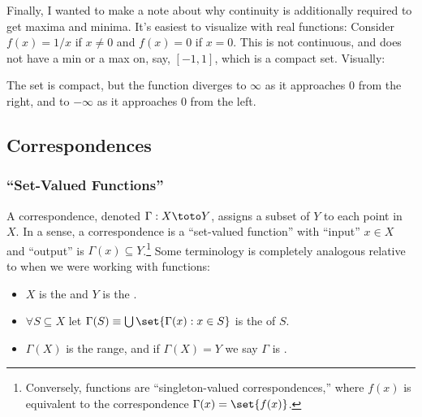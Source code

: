\documentclass{article}
\begin{document}
Finally, I wanted to make a note about why continuity is additionally required to get maxima and minima. It's easiest to visualize with real functions: Consider $f(x) = 1/x$ if $x \ne 0$ and $f(x) = 0$ if  $x = 0$. This is not continuous, and does not have a min or a max on, say, $[-1, 1]$, which is a compact set. Visually:
\begin{figure}[H]
  \centering
\end{figure}

The set is compact, but the function diverges to $\infty$ as it approaches $0$ from the right, and to $-\infty$ as it approaches $0$ from the left.

\subsection{Correspondences}
\label{sub:correspondences}

\subsubsection{``Set-Valued Functions''}
\label{ssub:_set_valued_functions_}

A correspondence, denoted $\Gamma: X \toto Y$, assigns a subset of $Y$ to each point in $X$. In a sense, a correspondence is a ``set-valued function'' with ``input'' $x \in X$ and ``output'' is $\Gamma(x) \subseteq Y$.\footnote{Conversely, functions are ``singleton-valued correspondences,'' where $f(x)$ is equivalent to the correspondence $\Gamma(x) = \set{f(x)}$.} Some terminology is completely analogous relative to when we were working with functions:
\begin{itemize}[label=$\bullet$]
  \item $X$ is the  and $Y$ is the .

  \item $\forall S \subseteq X$ let $\Gamma(S) \equiv \bigcup\set{\Gamma(x): x \in S}$ is the  of $S$.

  \item $\Gamma(X)$ is the range, and if $\Gamma(X) = Y$ we say $\Gamma$ is .
\end{itemize}
\end{document}
